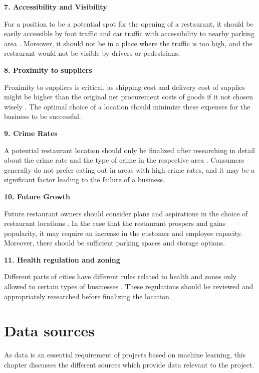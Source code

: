 \documentclass[a4paper, 11pt, oneside]{Thesis}  %
\begin{document}
\textbf{7.	Accessibility and Visibility}

For a position to be a potential spot for the opening of a restaurant, it should be easily accessible by foot traffic and car traffic with accessibility to nearby parking area \cite{Webstaurantstore.com.25.07.2018}. Moreover, it should not be in a place where the traffic is too high, and the restaurant would not be visible by drivers or pedestrians.

\textbf{8.	Proximity to suppliers}

Proximity to suppliers is critical, as shipping cost and delivery cost of supplies might be higher than the original net procurement costs of goods if it not chosen wisely \cite{Webstaurantstore.com.25.07.2018}. The optimal choice of a location should minimize these expenses for the business to be successful.

\textbf{9.	Crime Rates}

A potential restaurant location should only be finalized after researching in detail about the crime rate and the type of crime in the respective area \cite{Webstaurantstore.com.25.07.2018}. Consumers generally do not prefer eating out in areas with high crime rates, and it may be a significant factor leading to the failure of a business. 

\textbf{10.	Future Growth}

Future restaurant owners should consider plans and aspirations in the choice of restaurant locations \cite{Webstaurantstore.com.25.07.2018}. In the case that the restaurant prospers and gains popularity, it may require an increase in the customer and employee capacity. Moreover, there should be sufficient parking spaces and storage options.

\textbf{11.	Health regulation and zoning}

Different parts of cities have different rules related to health and zones only allowed to certain types of businesses \cite{Webstaurantstore.com.25.07.2018}. These regulations should be reviewed and appropriately researched before finalizing the location. 




\chapter{Data sources}
\label{Data sources}

As data is an essential requirement of projects based on machine learning, this chapter discusses the different sources which provide data relevant to the project.
\end{document}
